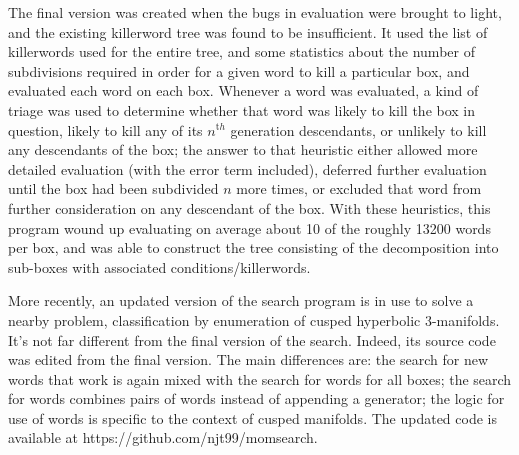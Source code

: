 The final version was created when the bugs in evaluation were
brought to light, and the existing killerword tree was found to be insufficient.
It used the list of killerwords used for the entire tree, and some
statistics about the number of subdivisions required in order for a
given word to kill a particular box, and evaluated each word on each box.
Whenever a word was evaluated,
a kind of triage was used to determine
whether that word was likely to kill the box in question, likely to kill
any of its $n^{\mathrm th}$ generation descendants, or unlikely to kill any
descendants of the box; the answer to that heuristic either allowed more
detailed evaluation (with the error term included), deferred further
evaluation until the box had been subdivided $n$ more times, or
excluded that word from further consideration on any descendant of
the box.  With these heuristics, this program wound up evaluating on
average about 10 of the roughly 13200 words per box, and was able to
construct the tree consisting of the decomposition into sub-boxes with associated conditions/killerwords.

More recently, an updated version of the search program is in use
to solve a nearby problem, classification by enumeration of cusped hyperbolic
3-manifolds.
It's not far different from the final version of the search.
Indeed, its source code was edited from the final version.
The main differences are:
the search for new words that work is again mixed
with the search for words for all boxes;
the search for words combines pairs of words instead of appending a generator;
the logic for use of words is specific to the context of cusped manifolds.
The updated code is available at https://github.com/njt99/momsearch.
